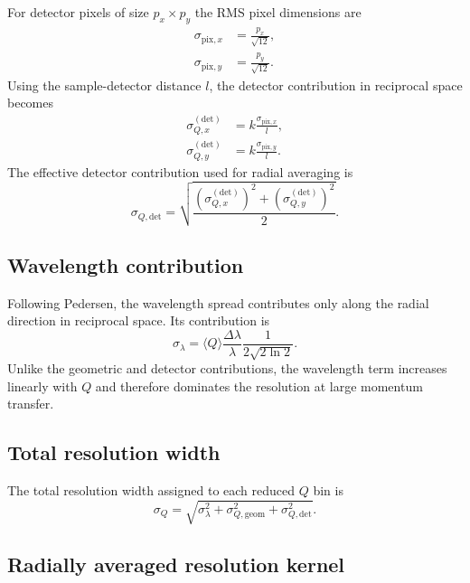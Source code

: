 For detector pixels of size $p_x \times p_y$ the RMS pixel dimensions are 
\begin{align} 
\sigma_{\mathrm{pix},x} &= \frac{p_x}{\sqrt{12}}, \\ 
\sigma_{\mathrm{pix},y} &= \frac{p_y}{\sqrt{12}}. 
\end{align} 
Using the sample-detector distance $l$, the detector contribution in reciprocal space becomes
\begin{align} 
\sigma_{Q,x}^{(\mathrm{det})} &= k \frac{\sigma_{\mathrm{pix},x}}{l}, \\ 
\sigma_{Q,y}^{(\mathrm{det})} &= k \frac{\sigma_{\mathrm{pix},y}}{l}. 
\end{align} 
The effective detector contribution used for radial averaging is 
\begin{equation} 
\sigma_{Q,\mathrm{det}} = \sqrt{ \frac{ \left( \sigma_{Q,x}^{(\mathrm{det})} \right)^2 + \left( \sigma_{Q,y}^{(\mathrm{det})} \right)^2 }{2} }. 
\end{equation} 

\subsection{Wavelength contribution} 

Following Pedersen, the wavelength spread contributes only along the radial direction in reciprocal space. Its contribution is 
\begin{equation} 
\sigma_{\lambda} = \langle Q\rangle \frac{\Delta\lambda}{\lambda} \frac{1}{2\sqrt{2\ln 2}}.
\end{equation} 
Unlike the geometric and detector contributions, the wavelength term increases linearly with $Q$ and therefore dominates the resolution at large momentum transfer. 

\subsection{Total resolution width} 

The total resolution width assigned to each reduced $Q$ bin is 
\begin{equation} 
\sigma_Q = \sqrt{ \sigma_{\lambda}^2 + \sigma_{Q,\mathrm{geom}}^2 + \sigma_{Q,\mathrm{det}}^2 }. 
\end{equation} 

\subsection{Radially averaged resolution kernel} 

